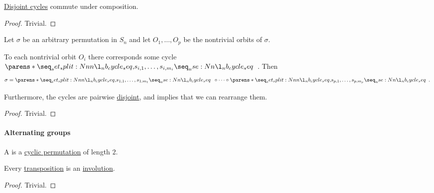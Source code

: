 \begin{proposition}\label{thm:disjoint_cycles_commute}
  \hyperref[def:disjoint_cycle]{Disjoint cycles} commute under composition.
\end{proposition}
\begin{proof}
  Trivial.
\end{proof}

\begin{proposition}\label{thm:permutation_decomposition_into_disjoint_cycles}
  Let \( \sigma \) be an arbitrary permutation in \( S_n \) and let \( O_1, \ldots, O_p \) be the nontrivial orbits of \( \sigma \).

  To each nontrivial orbit \( O_i \) there corresponds some cycle \( \cycle{ s_{i,1}, \ldots, s_{i,m_i} } \). Then
  \begin{equation*}
    \sigma = \cycle{ s_{1,1}, \ldots, s_{1,m_1} } \bincirc \cdots \bincirc \cycle{ s_{p,1}, \ldots, s_{p,m_p} }.
  \end{equation*}

  Furthermore, the cycles are pairwise \hyperref[def:disjoint_cycle]{disjoint}, and  implies that we can rearrange them.
\end{proposition}
\begin{proof}
  Trivial.
\end{proof}

\paragraph{Alternating groups}

\begin{definition}\label{def:transposition}
  A  is a \hyperref[def:cyclic_permutation]{cyclic permutation} of length \( 2 \).
\end{definition}

\begin{proposition}\label{thm:transpositions_are_involutions}
  Every \hyperref[def:transposition]{transposition} is an \hyperref[def:morphism_invertibility/involution]{involution}.
\end{proposition}
\begin{proof}
  Trivial.
\end{proof}

